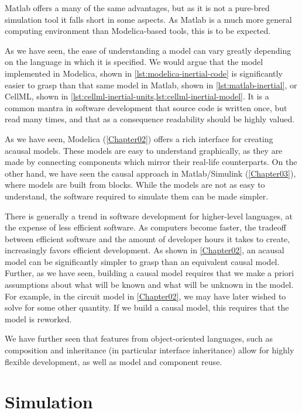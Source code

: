 \documentclass[\rootfolder/main.tex]{subfiles}
\begin{document}
Matlab offers a many of the same advantages, but as it is not a pure-bred simulation tool it falls short in some aspects.
As Matlab is a much more general computing environment than Modelica-based tools, this is to be expected.

As we have seen, the ease of understanding a model can vary greatly depending on the language in which it is specified.
We would argue that the model implemented in Modelica, shown in \cref{lst:modelica-inertial-code} is significantly easier to grasp than that same model in Matlab, shown in \cref{lst:matlab-inertial}, or CellML, shown in \cref{lst:cellml-inertial-units,lst:cellml-inertial-model}. 
It is a common mantra in software development that source code is written once, but read many times, and that as a consequence readability should be highly valued.

As we have seen, Modelica (\cref{Chapter02}) offers a rich interface for creating acausal models.
These models are easy to understand graphically, as they are made by connecting components which mirror their real-life counterparts.
On the other hand, we have seen the causal approach in Matlab/Simulink (\cref{Chapter03}), where models are built from blocks.
While the models are not as easy to understand, the software required to simulate them can be made simpler.

There is generally a trend in software development for higher-level languages, at the expense of less efficient software.
As computers become faster, the tradeoff between efficient software and the amount of developer hours it takes to create, increasingly favors efficient development.
As shown in \cref{Chapter02}, an acausal model can be significantly simpler to grasp than an equivalent causal model.
Further, as we have seen, building a causal model requires that we make a priori assumptions about what will be known and what will be unknown in the model.
For example, in the circuit model in \cref{Chapter02}, we may have later wished to solve for some other quantity.
If we build a causal model, this requires that the model is reworked.

We have further seen that features from object-oriented languages, such as composition and inheritance (in particular interface inheritance) allow for highly flexible development, as well as model and component reuse.

\section{Simulation}
\end{document}
